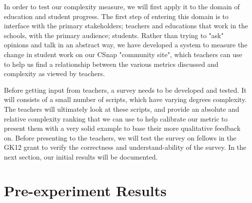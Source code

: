 \documentclass[]{article}
\begin{document}

In order to test our complexity measure, we will first apply it to the domain of education and student progress.
The first step of entering this domain is to interface with the primary stakeholders; teachers and educations that work in the schools, with the primary audience; students.
Rather than trying to "ask" opinions and talk in an abstract way, we have developed a system to measure the change in student work on our CSnap "community site", which teachers can use to help us find a relationship between the various metrics discussed and complexity as viewed by teachers.

Before getting input from teachers, a survey needs to be developed and tested.
It will consists of a small number of scripts, which have varying degrees complexity.
The teachers will ultimately look at these scripts, and provide an absolute and relative complexity ranking that we can use to help calibrate our metric to present them with a very solid example to base their more qualitative feedback on.
Before presenting to the teachers, we will test the survey on fellows in the GK12 grant to verify the correctness and understand-ability of the survey.
In the next section, our initial results will be documented.

\section{Pre-experiment Results}
\end{document}
